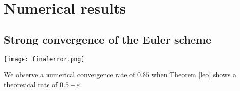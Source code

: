 \documentclass[12pt]{article}
\begin{document}
\section{Numerical results}
    \subsection{Strong convergence of the Euler scheme}
    
        \begin{center}
            \texttt{[image: finalerror.png]}
        \end{center}
    
    We observe a numerical convergence rate of $0.85$ when Theorem \ref{leo} shows a theoretical rate of $0.5-\varepsilon$.
 


    
\end{document}

